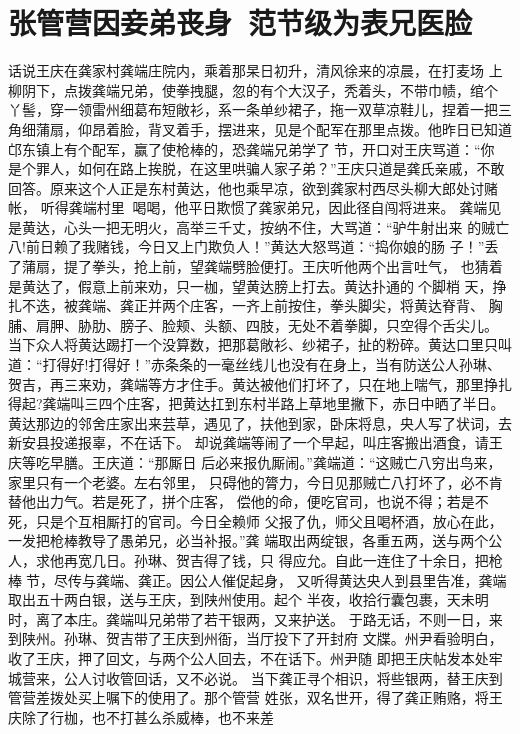 \chapter{张管营因妾弟丧身~范节级为表兄医脸}

话说王庆在龚家村龚端庄院内，乘着那杲日初升，清风徐来的凉晨，在打麦场
上柳阴下，点拨龚端兄弟，使拳拽腿，忽的有个大汉子，秃着头，不带巾帻，绾个
丫髻，穿一领雷州细葛布短敞衫，系一条单纱裙子，拖一双草凉鞋儿，捏着一把三
角细蒲扇，仰昂着脸，背叉着手，摆进来，见是个配军在那里点拨。他昨日已知道
邙东镇上有个配军，赢了使枪棒的，恐龚端兄弟学了节，开口对王庆骂道：“你
是个罪人，如何在路上挨脱，在这里哄骗人家子弟？”王庆只道是龚氏亲戚，不敢
回答。原来这个人正是东村黄达，他也乘早凉，欲到龚家村西尽头柳大郎处讨赌帐，
听得龚端村里喝喝，他平日欺惯了龚家弟兄，因此径自闯将进来。
龚端见是黄达，心头一把无明火，高举三千丈，按纳不住，大骂道：“驴牛射出来
的贼亡八!前日赖了我赌钱，今日又上门欺负人！”黄达大怒骂道：“捣你娘的肠
子！”丢了蒲扇，提了拳头，抢上前，望龚端劈脸便打。王庆听他两个出言吐气，
也猜着是黄达了，假意上前来劝，只一枷，望黄达膀上打去。黄达扑通的个脚梢
天，挣扎不迭，被龚端、龚正并两个庄客，一齐上前按住，拳头脚尖，将黄达脊背、
胸脯、肩胛、胁肋、膀子、脸颊、头额、四肢，无处不着拳脚，只空得个舌尖儿。
当下众人将黄达踢打一个没算数，把那葛敞衫、纱裙子，扯的粉碎。黄达口里只叫
道：“打得好!打得好！”赤条条的一毫丝线儿也没有在身上，当有防送公人孙琳、
贺吉，再三来劝，龚端等方才住手。黄达被他们打坏了，只在地上喘气，那里挣扎
得起?龚端叫三四个庄客，把黄达扛到东村半路上草地里撇下，赤日中晒了半日。
黄达那边的邻舍庄家出来芸草，遇见了，扶他到家，卧床将息，央人写了状词，去
新安县投递报辜，不在话下。
却说龚端等闹了一个早起，叫庄客搬出酒食，请王庆等吃早膳。王庆道：“那厮日
后必来报仇厮闹。”龚端道：“这贼亡八穷出鸟来，家里只有一个老婆。左右邻里，
只碍他的膂力，今日见那贼亡八打坏了，必不肯替他出力气。若是死了，拼个庄客，
偿他的命，便吃官司，也说不得；若是不死，只是个互相厮打的官司。今日全赖师
父报了仇，师父且喝杯酒，放心在此，一发把枪棒教导了愚弟兄，必当补报。”龚
端取出两绽银，各重五两，送与两个公人，求他再宽几日。孙琳、贺吉得了钱，只
得应允。自此一连住了十余日，把枪棒节，尽传与龚端、龚正。因公人催促起身，
又听得黄达央人到县里告准，龚端取出五十两白银，送与王庆，到陕州使用。起个
半夜，收拾行囊包裹，天未明时，离了本庄。龚端叫兄弟带了若干银两，又来护送。
于路无话，不则一日，来到陕州。孙琳、贺吉带了王庆到州衙，当厅投下了开封府
文牒。州尹看验明白，收了王庆，押了回文，与两个公人回去，不在话下。州尹随
即把王庆帖发本处牢城营来，公人讨收管回话，又不必说。
当下龚正寻个相识，将些银两，替王庆到管营差拨处买上嘱下的使用了。那个管营
姓张，双名世开，得了龚正贿赂，将王庆除了行枷，也不打甚么杀威棒，也不来差
